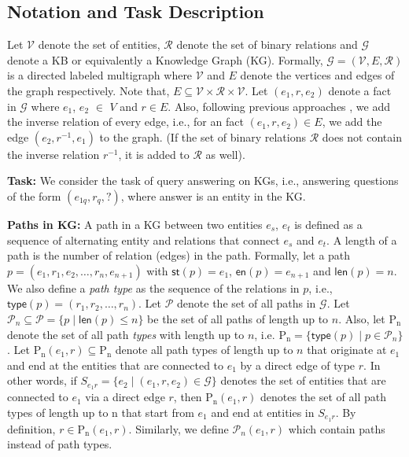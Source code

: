 \documentclass[11pt,a4paper]{article}
\newcommand{\ent}{\ensuremath{e}}
\newcommand{\rel}{\ensuremath{r}}
\newcommand{\pth}{\ensuremath{p}}
\newcommand{\stpath}{\ensuremath{\textsf{st}(\pth)}}
\newcommand{\enpath}{\ensuremath{\textsf{en}(\pth)}}
\newcommand{\lenpath}{\ensuremath{\textsf{len}(\pth)}}
\newcommand{\typepath}{\ensuremath{\textsf{type}(\pth)}}
\begin{document}
\subsection{Notation and Task Description}
\label{sub:notation}
 Let $\mathcal{V}$ denote the set of entities, $\mathcal{R}$ denote the set of binary relations and $\mathcal{G}$ denote a KB or equivalently a Knowledge Graph (KG). Formally, $\mathcal{G} = (\mathcal{V}, E, \mathcal{R})$ is a directed labeled multigraph where $\mathcal{V}$ and $E$ denote the vertices and edges of the graph respectively. Note that, $E \subseteq \mathcal{V} \times \mathcal{R} \times \mathcal{V}$. Let $\left(\ent_{1}, \rel, \ent_{2}\right)$ denote a fact in $\mathcal{G}$ where $\ent_{1}$, $\ent_{2}$ $\in$ $V$ and $\rel \in E$. Also, following previous approaches \citep{bordes2013translating}, we add the inverse relation of every edge, i.e., for an fact $(\ent_{1}, \rel, \ent_{2})\in E$, we add the edge $(\ent_{2}, \rel^{-1}, \ent_{1})$ to the graph. (If the set of binary relations $\mathcal{R}$ does not contain the inverse relation $\rel^{-1}$, it is added to $\mathcal{R}$ as well).

\textbf{Task:} We consider the task of query answering on KGs,  i.e., answering questions of the form $\left(\ent_{1q}, \rel_{q}, ?\right)$, where answer is an entity in the KG.

\textbf{Paths in KG:} A path in a KG between two entities $\ent_{s}$, $\ent_{t}$ is defined as a sequence of alternating entity and relations that connect $\ent_{s}$ and $\ent_{t}$. A length of a path is the number of relation (edges) in the path. Formally, let a path $\pth = (\ent_{1}, \rel_1, \ent_{2}, \ldots, \rel_{n}, \ent_{n+1})$ with $\stpath = \ent_{1}$, $\enpath = \ent_{n+1}$ and $\lenpath = n$. We also define a \emph{path type} as the sequence of the relations in $p$, i.e., $\typepath = (\rel_1, \rel_2, \ldots, \rel_n)$. Let $\mathcal{P}$ denote the set of all paths in $\mathcal{G}$. Let $\mathcal{P}_n \subseteq \mathcal{P} = \{p \mid \lenpath \leq n\}$ be the set of all paths of length up to $n$. Also, let  $\mathrm{P_{n}}$ denote the set of all path \emph{types} with length up to $n$, i.e. $\mathrm{P_{n}} = \{\typepath \mid p \in \mathcal{P}_n\}$. Let $\mathrm{P_{n}}(\ent_{1}, \rel) \subseteq \mathrm{P_{n}}$ denote all path types of length up to $n$ that originate at $\ent_{1}$ and end at the entities that are connected to $\ent_{1}$ by a direct edge of type $r$. In other words, if $S_{\ent_1 r} = \{\ent_{2} \mid (\ent_{1}, \rel, \ent_{2}) \in \mathcal{G}\}$ denotes the set of entities that are connected to $\ent_{1}$ via a direct edge $r$, then $\mathrm{P_{n}}(\ent_{1}, \rel)$ denotes the set of all path types of length up to n that start from $\ent_{1}$ and end at entities in $S_{\ent_1 r}$. By definition, $r \in \mathrm{P_{n}}(\ent_{1}, \rel)$. Similarly, we define $\mathcal{P}_n(\ent_{1}, \rel)$ which contain paths instead of path types.
\end{document}
